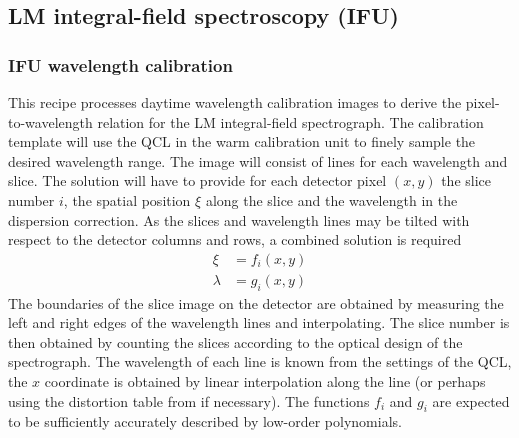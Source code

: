 
\clearpage
\subsection{LM integral-field spectroscopy (IFU)}
\label{ssec:IFU_recipes}


\subsubsection{IFU wavelength calibration}
\label{sssec:ifu_wavecal}
\label{rec:metis_ifu_wavecal}

This recipe processes daytime wavelength calibration images to derive
the pixel-to-wavelength relation for the LM integral-field
spectrograph. The calibration template will use the \ac{QCL} in the warm calibration unit to finely sample the desired
wavelength range. The image will consist of lines for each wavelength
and slice. The solution will have to provide for each detector pixel
$(x,y)$ the slice number $i$, the spatial position $\xi$ along the
slice and the wavelength in the dispersion correction. As the slices
and wavelength lines may be tilted with respect to the detector
columns and rows, a combined solution is required
\begin{eqnarray}
  \label{eq:wavelength_solution}
  \xi &= f_{i}(x, y) \\
  \lambda &= g_{i}(x, y)
\end{eqnarray}
The boundaries of the slice image on the detector are obtained by
measuring the left and right edges of the wavelength lines and
interpolating. The slice number is then obtained by counting the
slices according to the optical design of the spectrograph. The
wavelength of each line is known from the settings of the \ac{QCL}, the $x$
coordinate is obtained by linear interpolation along the line (or
perhaps using the distortion table from \hyperref[rec:metis_ifu_distortion]{} if
necessary). The functions $f_{i}$ and $g_{i}$ are expected to be
sufficiently accurately described by low-order polynomials.

